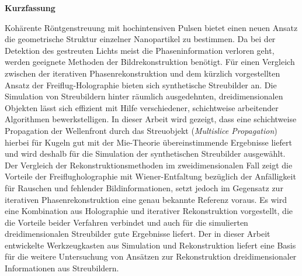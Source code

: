 	\begin{Huge}
		\textbf{Kurzfassung}\vspace{12mm}
	\end{Huge}

	Kohärente Röntgenstreuung mit hochintensiven Pulsen bietet einen neuen Ansatz die geometrische Struktur einzelner Nanopartikel zu bestimmen. Da bei der Detektion des gestreuten Lichts meist die Phaseninformation verloren geht, werden geeignete Methoden der Bildrekonstruktion benötigt. Für einen Vergleich zwischen der iterativen Phasenrekonstruktion und dem kürzlich vorgestellten Ansatz der Freiflug-Holographie bieten sich synthetische Streubilder an. Die Simulation von Streubildern hinter räumlich ausgedehnten, dreidimensionalen Objekten lässt sich effizient mit Hilfe verschiedener, schichtweise arbeitender Algorithmen bewerkstelligen. In dieser Arbeit wird gezeigt, dass eine schichtweise Propagation der Wellenfront durch das Streuobjekt (\textit{Multislice Propagation}) hierbei für Kugeln gut mit der Mie-Theorie übereinstimmende Ergebnisse liefert und wird deshalb für die Simulation der synthetischen Streubilder ausgewählt. Der Vergleich der Rekonstruktionsmethoden im zweidimensionalen Fall zeigt die Vorteile der Freiflugholographie mit Wiener-Entfaltung bezüglich der Anfälligkeit für Rauschen und fehlender Bildinformationen, setzt jedoch im Gegensatz zur iterativen Phasenrekonstruktion eine genau bekannte Referenz voraus. Es wird eine Kombination aus Holographie und iterativer Rekonstruktion vorgestellt, die die Vorteile beider Verfahren verbindet und auch für die simulierten dreidimensionalen Streubilder gute Ergebnisse liefert. Der in dieser Arbeit entwickelte Werkzeugkasten aus Simulation und Rekonstruktion liefert eine Basis für die weitere Untersuchung von Ansätzen zur Rekonstruktion dreidimensionaler Informationen aus Streubildern.

